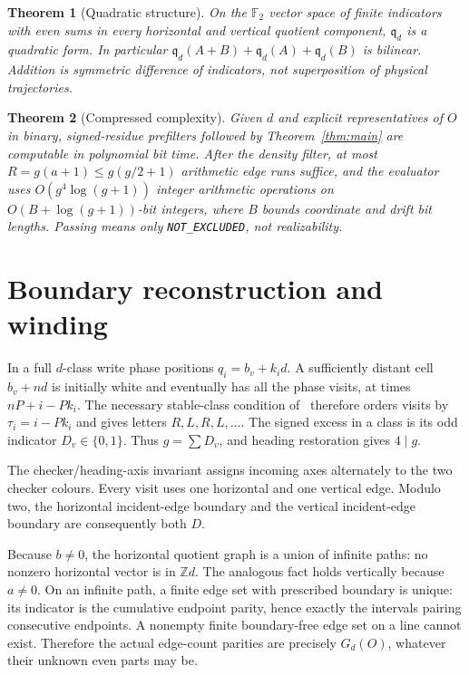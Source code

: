 \documentclass[11pt]{article}
\newtheorem{theorem}{Theorem}
\newcommand{\Z}{\mathbb Z}
\newcommand{\F}{\mathbb F_2}
\newcommand{\qd}{\mathfrak q_d}
\begin{document}
\begin{theorem}[Quadratic structure]\label{thm:quadratic}
On the $\F$ vector space of finite indicators with even sums in every horizontal
and vertical quotient component, $\qd$ is a quadratic form. In particular
$\qd(A+B)+\qd(A)+\qd(B)$ is bilinear. Addition is symmetric difference of
indicators, not superposition of physical trajectories.
\end{theorem}

\begin{theorem}[Compressed complexity]\label{thm:complexity}
Given $d$ and explicit representatives of $O$ in binary, signed-residue
prefilters followed by Theorem~\ref{thm:main} are computable in polynomial bit
time. After the density filter, at most
$R=g(a+1)\le g(g/2+1)$ arithmetic edge runs suffice, and the evaluator uses
$O(g^4\log(g+1))$ integer arithmetic operations on $O(B+\log(g+1))$-bit integers,
where $B$ bounds coordinate and drift bit lengths. Passing means only
\texttt{NOT\_EXCLUDED}, not realizability.
\end{theorem}

\section{Boundary reconstruction and winding}
In a full $d$-class write phase positions $q_i=b_v+k_i d$. A sufficiently distant
cell $b_v+nd$ is initially white and eventually has all the phase visits, at
times $nP+i-Pk_i$. The necessary stable-class condition of~\cite{J} therefore
orders visits by $\tau_i=i-Pk_i$ and gives letters $R,L,R,L,\ldots$.
The signed excess in a class is its odd indicator $D_v\in\{0,1\}$.
Thus $g=\sum D_v$, and heading restoration gives $4\mid g$.

The checker/heading-axis invariant assigns incoming axes alternately to the
two checker colours. Every visit uses one horizontal and one vertical edge.
Modulo two, the horizontal incident-edge boundary and the vertical
incident-edge boundary are consequently both $D$.

Because $b\ne0$, the horizontal quotient graph is a union of infinite paths:
no nonzero horizontal vector is in $\Z d$. The analogous fact holds vertically
because $a\ne0$. On an infinite path, a finite edge set with prescribed boundary
is unique: its indicator is the cumulative endpoint parity, hence exactly the
intervals pairing consecutive endpoints. A nonempty finite boundary-free edge
set on a line cannot exist. Therefore the actual edge-count parities are
precisely $G_d(O)$, whatever their unknown even parts may be.
\end{document}
